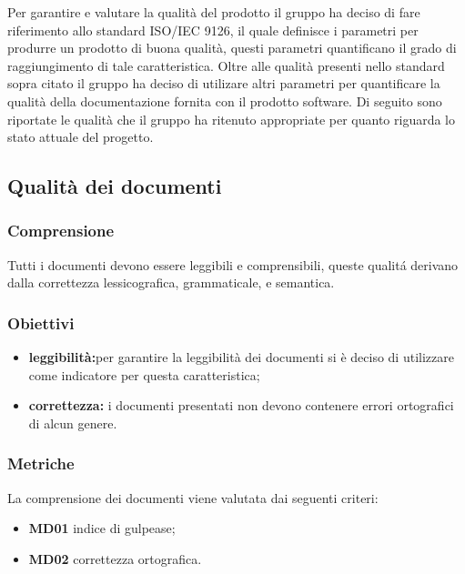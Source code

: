 Per garantire e valutare la qualità del prodotto il gruppo ha deciso di fare riferimento allo standard
ISO/IEC 9126, il quale definisce i parametri per produrre un prodotto di buona qualità, questi parametri
quantificano il grado di raggiungimento di tale caratteristica. Oltre alle qualità presenti nello
standard sopra citato il gruppo ha deciso di utilizare altri parametri per quantificare la qualità della
documentazione fornita con il prodotto software. Di seguito sono riportate le qualità che il gruppo ha
ritenuto appropriate per quanto riguarda lo stato attuale del progetto.

\subsection{Qualità dei documenti}

\subsubsection{Comprensione}
Tutti i documenti devono essere leggibili e comprensibili, queste qualitá derivano dalla correttezza
lessicografica, grammaticale, e semantica.

\subsubsection{Obiettivi}
\begin{itemize}
    \item \textbf{leggibilità:}per garantire la leggibilità dei documenti si è deciso di utilizzare  come indicatore per questa caratteristica;
    \item \textbf{correttezza:} i documenti presentati non devono contenere errori ortografici di alcun genere.
\end{itemize}

\subsubsection{Metriche}
La comprensione dei documenti viene valutata dai seguenti criteri:
\begin{itemize}
\item \textbf{MD01} indice di gulpease;
\item \textbf{MD02} correttezza ortografica.

\end{itemize}